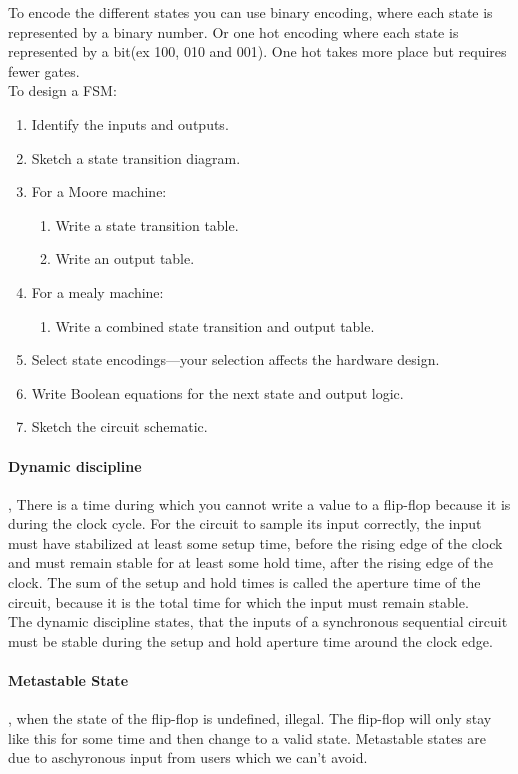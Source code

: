 	To encode the different states you can use binary encoding, where each state is represented by a binary number. Or one hot encoding where each state is represented by a bit(ex 100, 010 and 001). One hot takes more place but requires fewer gates.\\
	To design a FSM:
	\begin{enumerate}
		\item Identify the inputs and outputs.
		\item Sketch a state transition diagram.
		\item For a Moore machine:
			\begin{enumerate}
				\item Write a state transition table.
				\item Write an output table.
			\end{enumerate}
		\item For a mealy machine:
			\begin{enumerate}
				\item Write a combined state transition and output table.
			\end{enumerate}
		\item Select state encodings—your selection affects the hardware design.
		\item Write Boolean equations for the next state and output logic.
		\item Sketch the circuit schematic.
	\end{enumerate}
	\paragraph{Dynamic discipline}, There is a time during which you cannot write a value to a flip-flop because it is during the clock cycle. For the circuit to sample its input correctly, the input must have stabilized at least some setup time, before the rising edge of the clock and must remain stable for at least some hold time, after the rising edge of the clock. The sum of the setup and hold times is called the aperture time of the circuit, because it is the total time for which the input must remain stable.\\The dynamic discipline states, that the inputs of a synchronous sequential circuit must be stable during the setup and hold aperture time around the clock edge.
	\paragraph{Metastable State}, when the state of the flip-flop is undefined, illegal. The flip-flop will only stay like this for some time and then change to a valid state. Metastable states are due to aschyronous input from users which we can't avoid.
